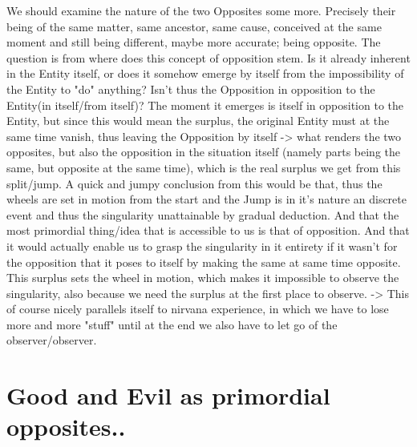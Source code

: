 \documentclass{book}
\begin{document}
We should examine the nature of the two Opposites some more. Precisely their being of the same matter, same ancestor, same cause, conceived at the same moment and still being different, maybe more accurate; being opposite. The question is from where does this concept of opposition stem. Is it already inherent in the Entity itself, or does it somehow emerge by itself from the impossibility of the Entity to "do" anything? Isn't thus the Opposition in opposition to the Entity(in itself/from itself)? The moment it emerges is itself in opposition to the Entity, but since this would mean the surplus, the original Entity must at the same time vanish, thus leaving the Opposition by itself -> what renders the two opposites, but also the opposition in the situation itself (namely parts being the same, but opposite at the same time), which is the real surplus we get from this split/jump. 
A quick and jumpy conclusion from this would be that, thus the wheels are set in motion from the start and the Jump is in it's nature an discrete event and thus the singularity unattainable by gradual deduction. And that the most primordial thing/idea that is accessible to us is that of opposition. And that it would actually enable us to grasp the singularity in it entirety if it wasn't for the opposition that it poses to itself by making the same at same time opposite. This surplus sets the wheel in motion, which makes it impossible to observe the singularity, also because we need the surplus at the first place to observe. -> This of course nicely parallels itself to nirvana experience, in which we have to lose more and more "stuff" until at the end we also have to let go of the observer/observer.


\section{Good and Evil as primordial opposites..}
\end{document}
